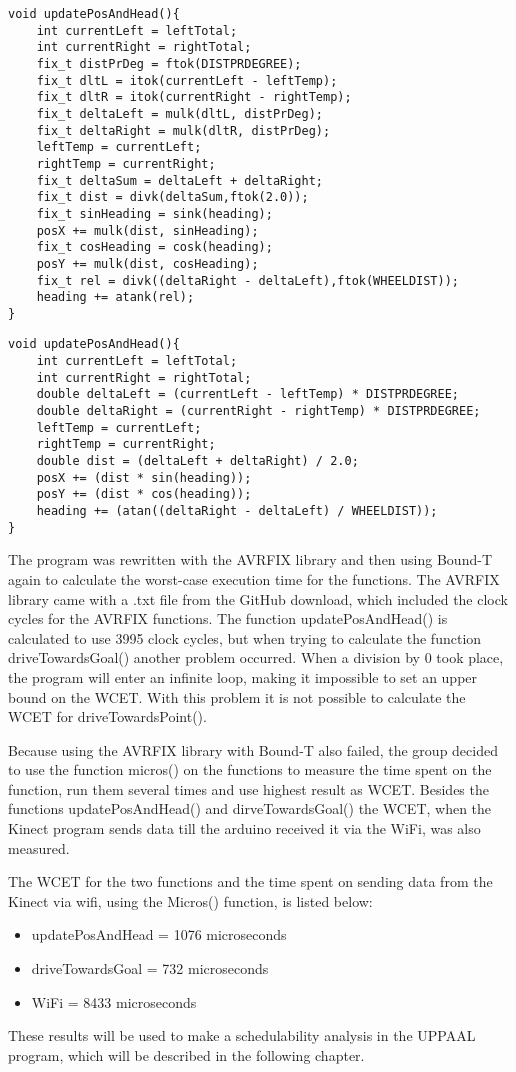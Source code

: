\begin{lstlisting}[caption={The function updatePosAndHead with AWRFIX library}, label={Update1}]
void updatePosAndHead(){
	int currentLeft = leftTotal;
	int currentRight = rightTotal;
	fix_t distPrDeg = ftok(DISTPRDEGREE);
	fix_t dltL = itok(currentLeft - leftTemp);
	fix_t dltR = itok(currentRight - rightTemp);
	fix_t deltaLeft = mulk(dltL, distPrDeg);
	fix_t deltaRight = mulk(dltR, distPrDeg);
	leftTemp = currentLeft;
	rightTemp = currentRight;
	fix_t deltaSum = deltaLeft + deltaRight;
	fix_t dist = divk(deltaSum,ftok(2.0));
	fix_t sinHeading = sink(heading);
	posX += mulk(dist, sinHeading);
	fix_t cosHeading = cosk(heading);
	posY += mulk(dist, cosHeading);
	fix_t rel = divk((deltaRight - deltaLeft),ftok(WHEELDIST));
	heading += atank(rel);
}
\end{lstlisting}

\begin{lstlisting}[caption={The function updatePosAndHead from the Arduino IDE}, label={Update2}]
void updatePosAndHead(){
	int currentLeft = leftTotal;
	int currentRight = rightTotal;
	double deltaLeft = (currentLeft - leftTemp) * DISTPRDEGREE;
	double deltaRight = (currentRight - rightTemp) * DISTPRDEGREE;
	leftTemp = currentLeft;
	rightTemp = currentRight;
	double dist = (deltaLeft + deltaRight) / 2.0;
	posX += (dist * sin(heading));
	posY += (dist * cos(heading));
	heading += (atan((deltaRight - deltaLeft) / WHEELDIST));
}
\end{lstlisting}

The program was rewritten with the AVRFIX library and then using Bound-T again to calculate the worst-case execution time for the functions. The AVRFIX library came with a .txt file from the GitHub download, which included the clock cycles for the AVRFIX functions. \newline
The function updatePosAndHead() is calculated to use 3995 clock cycles, but when trying to calculate the function driveTowardsGoal() another problem occurred. When a division by 0 took place, the program will enter an infinite loop, making it impossible to set an upper bound on the WCET. With this problem it is not possible to calculate the WCET for driveTowardsPoint().

Because using the AVRFIX library with Bound-T also failed, the group decided to use the function micros() on the functions to measure the time spent on the function, run them several times and use highest result as WCET. Besides the functions updatePosAndHead() and dirveTowardsGoal() the WCET, when the Kinect program sends data till the arduino received it via the WiFi, was also measured. 

The WCET for the two functions and the time spent on sending data from the Kinect via wifi, using the Micros() function, is listed below:
\begin{itemize}
	\item updatePosAndHead = 1076 microseconds
	\item driveTowardsGoal = 732 microseconds
	\item WiFi = 8433 microseconds
\end{itemize}

These results will be used to make a schedulability analysis in the UPPAAL program, which will be described in the following chapter.

